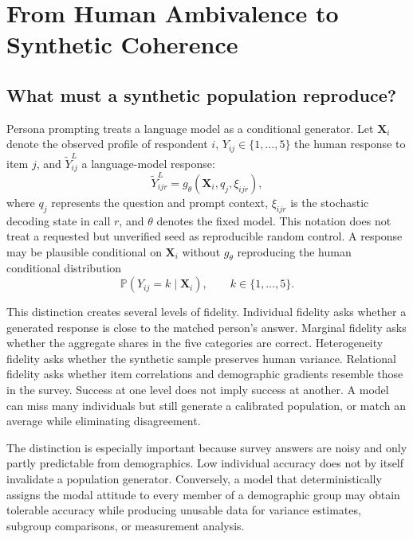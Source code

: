 \documentclass[11pt]{article}
\newcommand{\Prob}{\mathbb{P}}
\begin{document}
\section{From Human Ambivalence to Synthetic Coherence}

\subsection{What must a synthetic population reproduce?}

Persona prompting treats a language model as a conditional generator. Let $\bm{X}_i$ denote the observed profile of respondent $i$, $Y_{ij}\in\{1,\ldots,5\}$ the human response to item $j$, and $\widetilde{Y}^{L}_{ij}$ a language-model response:
\begin{equation}
    \widetilde{Y}^{L}_{ijr}
    =
    g_{\theta}\!\left(\bm{X}_i, q_j, \xi_{ijr}\right),
    \label{eq:llm-generator}
\end{equation}
where $q_j$ represents the question and prompt context, $\xi_{ijr}$ is the stochastic decoding state in call $r$, and $\theta$ denotes the fixed model. This notation does not treat a requested but unverified seed as reproducible random control. A response may be plausible conditional on $\bm{X}_i$ without $g_{\theta}$ reproducing the human conditional distribution
\begin{equation}
    \Prob\!\left(Y_{ij}=k\mid \bm{X}_i\right),
    \qquad k\in\{1,\ldots,5\}.
    \label{eq:human-target}
\end{equation}

This distinction creates several levels of fidelity. Individual fidelity asks whether a generated response is close to the matched person's answer. Marginal fidelity asks whether the aggregate shares in the five categories are correct. Heterogeneity fidelity asks whether the synthetic sample preserves human variance. Relational fidelity asks whether item correlations and demographic gradients resemble those in the survey. Success at one level does not imply success at another. A model can miss many individuals but still generate a calibrated population, or match an average while eliminating disagreement.

The distinction is especially important because survey answers are noisy and only partly predictable from demographics. Low individual accuracy does not by itself invalidate a population generator. Conversely, a model that deterministically assigns the modal attitude to every member of a demographic group may obtain tolerable accuracy while producing unusable data for variance estimates, subgroup comparisons, or measurement analysis.
\end{document}
